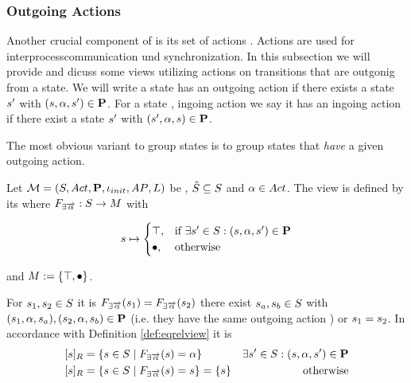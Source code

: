 \documentclass[preview]{standalone}
\begin{document}
\subsubsection{Outgoing Actions}
Another crucial component of \achgphN is its set of actions \actions. Actions are used for interprocesscommunication und synchronization. In this subsection we will provide and dicuss some views utilizing actions on transitions that are outgonig from a state. 
We will write a state \state has an outgoing action \action if there exists a state ${s}'$ with $({s}, {\alpha}, {s}') \in {\ensuremath{{\textbf{P}}}}$. For a state \state, ingoing action \action we say it has an ingoing action \action if there exist a state ${s}'$ with $({s}', {\alpha}, {s}) \in {\ensuremath{{\textbf{P}}}}$.

The most obvious variant to group states is to group states that \emph{have} a given outgoing action.

\begin{definition}
	Let ${{{\mathcal{M}}}} = {{({S}, {Act}, {\textbf{P}}, {\iota_{init}}, {AP}, {L})}}$ be \achgphN, ${\tilde{{S}}} \subseteq {S}$ and ${\alpha} \in {Act}$. The view \viewhasoutaction is defined by its \grpfctN where ${{F_{{\exists{\overrightarrow{\ensuremath{{\alpha}}}}}}}} : {S} \to {\ensuremath{{M}}}$ with 
	
	\[
	{s} \mapsto
	\begin{cases}
			{\top},				& \text{if } \exists {s}' \in {S}: ({s}, {\alpha}, {s}') \in {\ensuremath{{\textbf{P}}}} \\
			{\bullet},          	& \text{otherwise}
		\end{cases}
	\]
	
	and ${{M}} := {\{{\top}, {\bullet}\}}$. %
\end{definition}


For ${s}_1,{s}_2 \in {S}$ it is ${{F_{{\exists{\overrightarrow{\ensuremath{{\alpha}}}}}}}}({s}_1) = {{F_{{\exists{\overrightarrow{\ensuremath{{\alpha}}}}}}}}({s}_2)$ \iffN 
there exist ${s}_{a},{s}_{b} \in {S}$ with 
$({s}_1, {\alpha}, {s}_{a}), ({s}_2, {\alpha}, {s}_{b}) \in {\ensuremath{{\textbf{P}}}}$ (i.e. they have the same outgoing action \action) or ${s}_1 = {s}_2$. 
In accordance with Definition \ref{def:eqrelview} it is
\begin{align*}
	{\ensuremath{{[{s}]_{{R}}}}} &= \{{s} \in {S} \mid {\ensuremath{{F_{{\exists{\overrightarrow{\ensuremath{{\alpha}}}}}}}}}({s}) = {\alpha}\} &\exists{s}' \in {S} : ({s}, {\alpha}, {s}') \in {\ensuremath{{\textbf{P}}}} \\
	{{[{s}]_{{R}}}} &= \{{s} \in {S} \mid {\ensuremath{{F_{{\exists{\overrightarrow{\ensuremath{{\alpha}}}}}}}}}({s}) = {s}\} = \{s\} &\text{ otherwise}
\end{align*}
\end{document}
